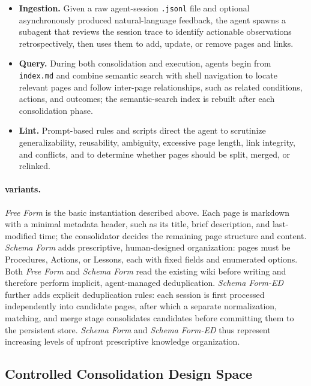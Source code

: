 \begin{itemize}[leftmargin=*,itemsep=2pt,topsep=3pt]
    \item \textbf{Ingestion.} Given a raw agent-session \texttt{.jsonl} file
    and optional asynchronously produced natural-language feedback, the
    \method{} agent spawns a subagent that reviews the session trace to
    identify actionable observations retrospectively, then uses them to add,
    update, or remove pages and links.
    \item \textbf{Query.} During both consolidation and execution, agents begin
    from \texttt{index.md} and combine semantic search with shell navigation to
    locate relevant pages and follow inter-page relationships, such as related
    conditions, actions, and outcomes; the semantic-search index is rebuilt
    after each consolidation phase.
    \item \textbf{Lint.} Prompt-based rules and scripts direct the agent to
    scrutinize generalizability, reusability, ambiguity, excessive page length,
    link integrity, and conflicts, and to determine whether pages should be
    split, merged, or relinked.
\end{itemize}

\paragraph{\method{} variants.}
\emph{Free Form} is the basic \method{} instantiation described above. Each
page is markdown with a minimal metadata header, such as its title, brief
description, and last-modified time; the consolidator decides the remaining
page structure and content. \emph{Schema Form} adds prescriptive,
human-designed organization: pages must be Procedures, Actions, or Lessons,
each with fixed fields and enumerated options. Both \emph{Free Form} and
\emph{Schema Form} read the existing wiki before writing and therefore perform
implicit, agent-managed deduplication. \emph{Schema Form-ED} further adds explicit deduplication
rules: each session is first processed independently into candidate pages,
after which a separate normalization, matching, and merge stage consolidates
candidates before committing them to the persistent store. \emph{Schema Form}
and \emph{Schema Form-ED} thus represent increasing levels of upfront
prescriptive knowledge organization.


\subsection{Controlled Consolidation Design Space}
\label{sec:design-space}

